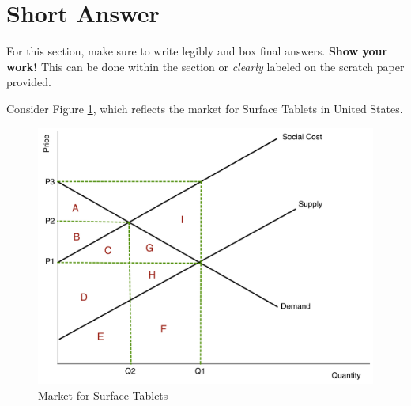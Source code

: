 \documentclass[addpoints,11pt]{exam}
\theoremstyle{definition}
\begin{document}
\newpage

\section*{Short Answer}

For this section, make sure to write legibly and box final answers. \textbf{Show your work!} This can be done within the section or \textit{clearly} labeled on the scratch paper provided.

\begin{questions}


	\question Consider Figure \ref{SA1}, which reflects the market for Surface Tablets in United States.
	
	\begin{figure}[H]
		\centering
		\includegraphics[scale=.45]{Exam1_SA1.pdf}
		\caption{Market for Surface Tablets}
		\label{SA1}
	\end{figure}
	
\end{questions}
\end{document}
